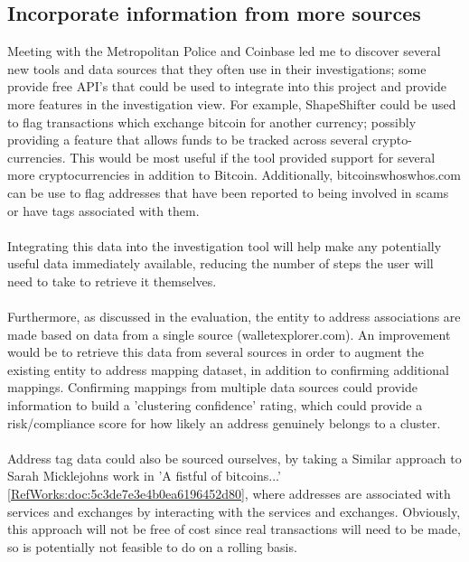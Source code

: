 \subsection{Incorporate information from more sources}
Meeting with the Metropolitan Police and Coinbase led me to discover several new tools and data sources that they often use in their investigations; some provide free API's that could be used to integrate into this project and provide more features in the investigation view. For example, ShapeShifter could be used to flag transactions which exchange bitcoin for another currency; possibly providing a feature that allows funds to be tracked across several crypto-currencies. This would be most useful if the tool provided support for several more cryptocurrencies in addition to Bitcoin. Additionally, bitcoinswhoswhos.com can be use to flag addresses that have been reported to being involved in scams or have tags associated with them. 
\\\\
Integrating this data into the investigation tool will help make any potentially useful data immediately available, reducing the number of steps the user will need to take to retrieve it themselves. 
\\\\
Furthermore, as discussed in the evaluation, the entity to address associations are made based on data from a single source (walletexplorer.com). An improvement would be to retrieve this data from several sources in order to augment the existing entity to address mapping dataset, in addition to confirming additional mappings. Confirming mappings from multiple data sources could provide information to build a 'clustering confidence' rating, which could provide a risk/compliance score for how likely an address genuinely belongs to a cluster. 
\\\\
Address tag data could also be sourced ourselves, by taking a Similar approach to Sarah Micklejohns work in 'A fistful of bitcoins...' \ref{RefWorks:doc:5c3de7e3e4b0ea6196452d80}, where addresses are associated with services and exchanges by interacting with the services and exchanges. Obviously, this approach will not be free of cost since real transactions will need to be made, so is potentially not feasible to do on a rolling basis.

